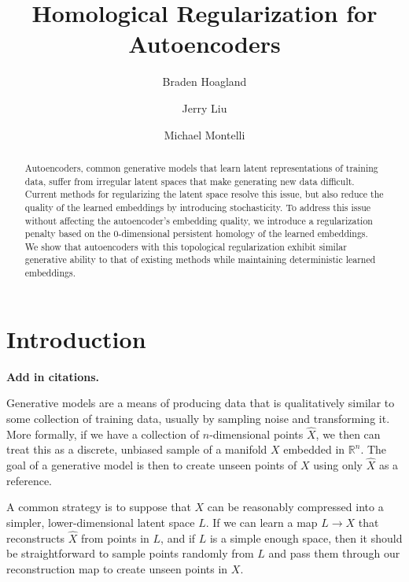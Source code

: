 \documentclass[conference]{IEEEtran}
\newcommand{\warn}[1]{\textbf{\color{red}#1}}
\newcommand{\R}{\mathbb{R}}
\begin{document}
\title{Homological Regularization for Autoencoders}
\author{Braden Hoagland \and Jerry Liu \and Michael Montelli}
\maketitle

\begin{abstract}
	Autoencoders, common generative models that learn latent representations of training data, suffer from irregular latent spaces that make generating new data difficult. Current methods for regularizing the latent space resolve this issue, but also reduce the quality of the learned embeddings by introducing stochasticity. To address this issue without affecting the autoencoder's embedding quality, we introduce a regularization penalty based on the 0-dimensional persistent homology of the learned embeddings. We show that autoencoders with this topological regularization exhibit similar generative ability to that of existing methods while maintaining deterministic learned embeddings.
\end{abstract}

\section{Introduction}

\warn{Add in citations.}

Generative models are a means of producing data that is qualitatively similar to some collection of training data, usually by sampling noise and transforming it. More formally, if we have a collection of $n$-dimensional points $\hat{X}$, we then can treat this as a discrete, unbiased sample of a manifold $X$ embedded in $\R^{n}$. The goal of a generative model is then to create unseen points of $X$ using only $\hat{X}$ as a reference.

A common strategy is to suppose that $X$ can be reasonably compressed into a simpler, lower-dimensional latent space $L$. If we can learn a map $L\to X$ that reconstructs $\hat{X}$ from points in $L$, and if $L$ is a simple enough space, then it should be straightforward to sample points randomly from $L$ and pass them through our reconstruction map to create unseen points in $X$.
\end{document}

